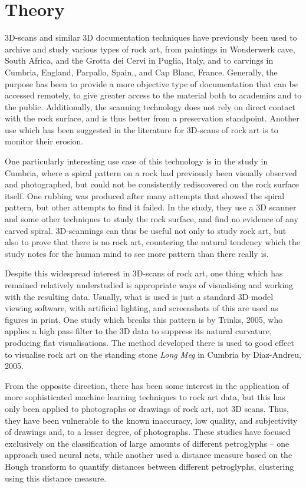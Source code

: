 \documentclass[a4paper,reqno,oneside]{amsart} %
\theoremstyle{definition}
\theoremstyle{remark}
\numberwithin{equation}{section}
\begin{document}
\section{Theory}

3D-scans and similar 3D documentation techniques have previously been used to archive and study various types of rock art, from paintings in Wonderwerk cave, South Africa\cite{wonderwerk}, and the Grotta dei Cervi in Puglia, Italy\cite{gdeicervi}, and to carvings in Cumbria, England,\cite{cumbria} Parpallo, Spain,\cite{parpallo}, and Cap Blanc, France\cite{capblanc}. Generally, the purpose has been to provide a more objective type of documentation that can be accessed remotely, to give greater access to the material both to academics and to the public. Additionally, the scanning technology does not rely on direct contact with the rock surface, and is thus better from a preservation standpoint. Another use which has been suggested in the literature for 3D-scans of rock art is to monitor their erosion.\cite{erosion,portugal}

One particularly interesting use case of this technology is in the study in Cumbria, where a spiral pattern on a rock had previously been visually observed and photographed, but could not be consistently rediscovered on the rock surface itself. One rubbing was produced after many attempts that showed the spiral pattern, but other attempts to find it failed. In the study, they use a 3D scanner and some other techniques to study the rock surface, and find no evidence of any carved spiral. 3D-scannings can thus be useful not only to study rock art, but also to prove that there is no rock art, countering the natural tendency which the study notes for the human mind to see more pattern than there really is.

Despite this widespread interest in 3D-scans of rock art, one thing which has remained relatively understudied is appropriate ways of visualising and working with the resulting data. Usually, what is used is just a standard 3D-model viewing software, with artificial lighting, and screenshots of this are used as figures in print. One study which breaks this pattern is by Trinks, 2005\cite{trinks}, who applies a high pass filter to the 3D data to suppress its natural curvature, producing flat visualisations. The method developed there is used to good effect to visualise rock art on the standing stone \emph{Long Meg} in Cumbria by Diaz-Andreu, 2005\cite{longmeg}.

From the opposite direction, there has been some interest in the application of more sophisticated machine learning techniques to rock art data, but this has only been applied to photographs or drawings of rock art, not 3D scans. Thus, they have been vulnerable to the known inaccuracy, low quality, and subjectivity of drawings and, to a lesser degree, of photographs. These studies have focused exclusively on the classification of large amounts of different petroglyphs -- one approach used neural nets\cite{patrec,kohonen}, while another used a distance measure based on the Hough transform to quantify distances between different petroglyphs, clustering using this distance measure.\cite{towindexing}
\end{document}

